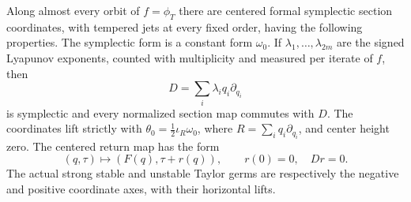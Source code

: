\begin{lemma}
\label{sym:graded-contact}
Along almost every orbit of $f=\phi_T$ there are centered formal
symplectic section coordinates, with tempered jets at every fixed
order, having the following properties.  The symplectic form is a
constant form $\omega_0$.  If $\lambda_1,\ldots,\lambda_{2m}$ are the
signed Lyapunov exponents, counted with multiplicity and measured per
iterate of $f$, then
\[
 D=\sum_i\lambda_iq_i\partial_{q_i}
\]
is symplectic and every normalized section map commutes with $D$.
The coordinates lift strictly with
$\theta_0=\tfrac12\iota_R\omega_0$, where
$R=\sum_iq_i\partial_{q_i}$, and center height zero.  The centered return
map has the form
\begin{equation}
 \label{sym:graded-return}
 (q,\tau)\longmapsto(F(q),\tau+r(q)),
 \qquad r(0)=0,\quad Dr=0.
\end{equation}
The actual strong stable and unstable Taylor germs are respectively
the negative and positive coordinate axes, with their horizontal
lifts.
\end{lemma}


